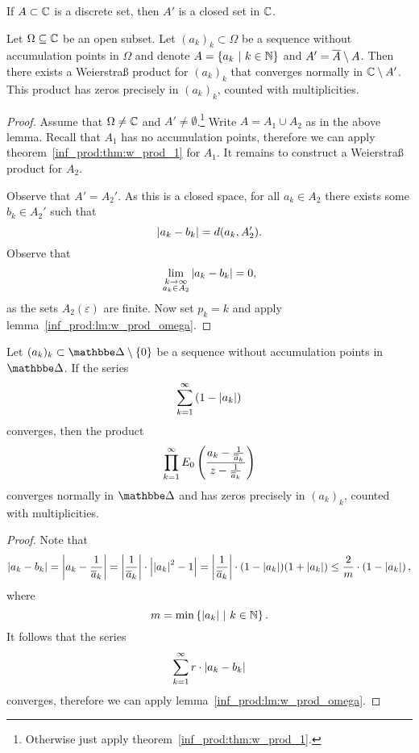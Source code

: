 \begin{opomba}
If $A \subset \mathbb{C}$ is a discrete set, then $A'$ is a closed set in
$\mathbb{C}$.
\end{opomba}


\begin{izrek}
Let $\Omega \subseteq \mathbb{C}$ be an open subset. Let
$(a_k)_k \subset \Omega$ be a sequence without accumulation points
in $\Omega$ and denote $A = \left\{a_k~\middle\vert~k \in \mathbb{N}\right\}$ and
$A' = \overline{A} \setminus A$. Then there exists a Weierstraß
product for $(a_k)_k$ that converges normally in $\mathbb{C} \setminus A'$.
This product has zeros precisely in $(a_k)_k$, counted with
multiplicities.
\end{izrek}

\begin{proof}
Assume that $\Omega \ne \mathbb{C}$ and
$A' \ne \emptyset$.\footnote{Otherwise just apply
theorem~\ref{inf_prod:thm:w_prod_1}.} Write $A = A_1 \cup A_2$ as
in the above lemma. Recall that $A_1$ has no accumulation points,
therefore we can apply theorem~\ref{inf_prod:thm:w_prod_1} for
$A_1$. It remains to construct a Weierstraß product for $A_2$.

Observe that $A' = A_2'$. As this is a closed space, for all
$a_k \in A_2$ there exists some $b_k \in A_2'$ such that
\[
\left\lvert a_k - b_k\right\rvert = d(a_k, A_2').
\]
Observe that
\[
\lim_{\substack{k \to \infty \\ a_k \in A_2}} \left\lvert a_k - b_k\right\rvert = 0,
\]
as the sets $A_2(\varepsilon)$ are finite. Now set $p_k = k$ and
apply lemma~\ref{inf_prod:lm:w_prod_omega}.
\end{proof}

\begin{posledica}
Let $(a_k)_k \subset \dsk \setminus \set{0}$ be a sequence without
accumulation points in $\dsk$. If the series
\[
\sum_{k=1}^\infty \left(1 - \left\lvert a_k\right\rvert\right)
\]
converges, then the product
\[
\prod_{k=1}^\infty
E_0 \left(\frac{a_k - \frac{1}{\overline{a}_k}}
{z - \frac{1}{\overline{a}_k}}\right)
\]
converges normally in $\dsk$ and has zeros precisely in $(a_k)_k$,
counted with multiplicities.
\end{posledica}

\begin{proof}
Note that
\[
\left\lvert a_k - b_k\right\rvert =
\left\lvert a_k - \frac{1}{\overline{a}_k}\right\rvert =
\left\lvert \frac{1}{\overline{a}_k}\right\rvert \cdot \left\lvert \left\lvert a_k\right\rvert^2 - 1\right\rvert =
\left\lvert \frac{1}{\overline{a}_k}\right\rvert \cdot
(1 - \left\lvert a_k\right\rvert) (1 + \left\lvert a_k\right\rvert) \leq
\frac{2}{m} \cdot \left(1 - \left\lvert a_k\right\rvert\right),
\]
where
\[
m = \min \left\{\left\lvert a_k\right\rvert~\middle\vert~k \in \mathbb{N}\right\}.
\]
It follows that the series
\[
\sum_{k=1}^\infty r \cdot \left\lvert a_k - b_k\right\rvert
\]
converges, therefore we can apply
lemma~\ref{inf_prod:lm:w_prod_omega}.
\end{proof}

